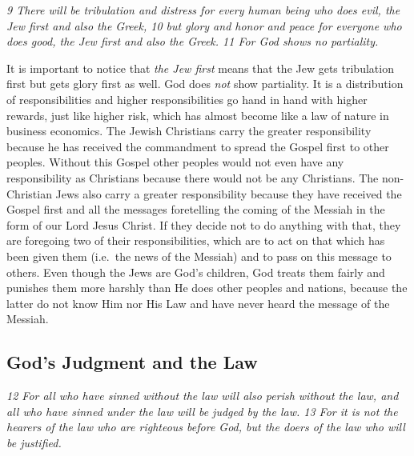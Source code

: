 \emph{9 There will be tribulation and distress for every human being who
does evil, the Jew first and also the Greek, 10 but glory and honor and
peace for everyone who does good, the Jew first and also the Greek. 11
For God shows no partiality.}

It is important to notice that \emph{the Jew first} means that the Jew
gets tribulation first but gets glory first as well. God does \emph{not}
show partiality. It is a distribution of responsibilities and higher
responsibilities go hand in hand with higher rewards, just like higher
risk, which has almost become like a law of nature in business
economics. The Jewish Christians carry the greater responsibility
because he has received the commandment to spread the Gospel first to
other peoples. Without this Gospel other peoples would not even have any
responsibility as Christians because there would not be any Christians.
The non-Christian Jews also carry a greater responsibility because they
have received the Gospel first and all the messages foretelling the
coming of the Messiah in the form of our Lord Jesus Christ. If they
decide not to do anything with that, they are foregoing two of their
responsibilities, which are to act on that which has been given them
(i.e.~the news of the Messiah) and to pass on this message to others.
Even though the Jews are God's children, God treats them fairly and
punishes them more harshly than He does other peoples and nations,
because the latter do not know Him nor His Law and have never heard the
message of the Messiah.

\subsection{God's Judgment and the Law} \emph{12 For all who have sinned
without the law will also perish without the law, and all who have
sinned under the law will be judged by the law. 13 For it is not the
hearers of the law who are righteous before God, but the doers of the
law who will be justified.}


